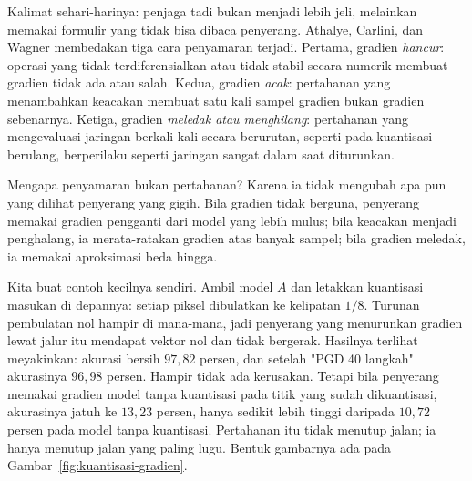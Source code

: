 Kalimat sehari-harinya: penjaga tadi bukan menjadi lebih jeli, melainkan memakai
formulir yang tidak bisa dibaca penyerang. Athalye, Carlini, dan Wagner membedakan
tiga cara penyamaran terjadi. Pertama, gradien \emph{hancur}: operasi yang tidak
terdiferensialkan atau tidak stabil secara numerik membuat gradien tidak ada atau
salah. Kedua, gradien \emph{acak}: pertahanan yang menambahkan keacakan membuat satu
kali sampel gradien bukan gradien sebenarnya. Ketiga, gradien \emph{meledak atau
menghilang}: pertahanan yang mengevaluasi jaringan berkali-kali secara berurutan,
seperti pada kuantisasi berulang, berperilaku seperti jaringan sangat dalam saat
diturunkan.

Mengapa penyamaran bukan pertahanan? Karena ia tidak mengubah apa pun yang dilihat
penyerang yang gigih. Bila gradien tidak berguna, penyerang memakai gradien pengganti
dari model yang lebih mulus; bila keacakan menjadi penghalang, ia merata-ratakan
gradien atas banyak sampel; bila gradien meledak, ia memakai aproksimasi beda hingga.

Kita buat contoh kecilnya sendiri. Ambil model $A$ dan letakkan kuantisasi
masukan di depannya: setiap piksel dibulatkan ke kelipatan $1/8$. Turunan pembulatan
nol hampir di mana-mana, jadi penyerang yang menurunkan gradien lewat jalur itu
mendapat vektor nol dan tidak bergerak. Hasilnya terlihat meyakinkan: akurasi bersih
$97{,}82$ persen, dan setelah "PGD 40 langkah" akurasinya $96{,}98$ persen. Hampir
tidak ada kerusakan. Tetapi bila penyerang memakai gradien model tanpa kuantisasi
pada titik yang sudah dikuantisasi, akurasinya jatuh ke $13{,}23$ persen, hanya sedikit
lebih tinggi daripada $10{,}72$ persen pada model tanpa kuantisasi. Pertahanan itu
tidak menutup jalan; ia hanya menutup jalan yang paling lugu. Bentuk gambarnya ada
pada Gambar~\ref{fig:kuantisasi-gradien}.

